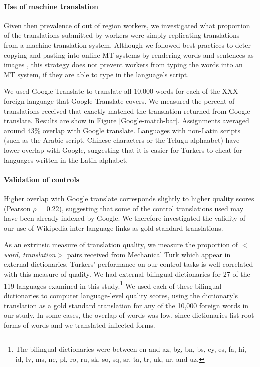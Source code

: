 \documentclass[11pt]{article}
\begin{document}
\paragraph{Use of machine translation}

Given then prevalence of out of region workers, we investigated what proportion of the translations submitted by workers were simply replicating translations from a machine translation system.  Although we followed best practices to deter copying-and-pasting into online MT systems  by  rendering words and sentences as images \cite{zaidan-callisonburch:2011:ACL-HLT2011a}, this strategy does not prevent workers from typing the words into an MT system, if they are able to type in the language's script. 

We used Google Translate to translate all 10,000 words for each of the XXX foreign language that Google Translate covers. We measured the percent of translations received that exactly matched the translation returned from Google translate. Results are show in Figure \ref{Google-match-bar}. 
Assignments averaged around 43\% overlap with Google translate.  Languages with non-Latin scripts (such as the Arabic script, Chinese characters or the Telugu alphaabet) have lower overlap with Google, suggesting that it is easier for Turkers to cheat for languages written in the Latin alphabet. 



\paragraph{Validation of controls} 
Higher overlap with Google translate corresponds slightly to higher quality scores (Pearson $\rho$ = 0.22), suggesting that some of the control translations used may have been already indexed by Google. We therefore investigated the validity of our use of Wikipedia inter-language links as gold standard translations.

As an extrinsic measure of translation quality, we measure the proportion of $<${\it word, translation}$>$ pairs received from Mechanical Turk which appear in external dictionaries. Turkers' performance on our control tasks is well correlated with this measure of quality.    We had external bilingual dictionaries for 27 of the 119 languages examined in this study.\footnote{The bilingual dictionaries were between en and az, bg, bn, bs, cy, es, fa, hi, id, lv, ms, ne, pl, ro, ru, sk, so, sq, sr, ta, tr, uk, ur, and uz. }  We used each of these bilingual dictionaries to computer language-level quality scores, using the dictionary's translation as a gold standard translation for any of the 10,000 foreign words in our study.  In some cases, the overlap of words was low, since dictionaries list root forms of words and we translated inflected forms.  
\end{document}
